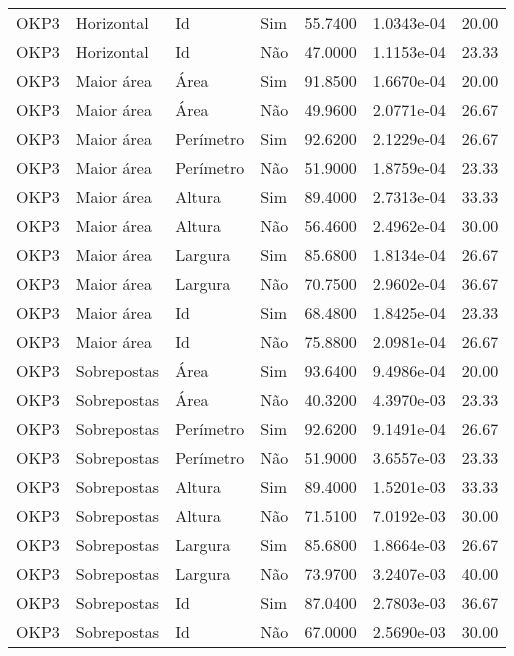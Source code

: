 \begin{tabular}{llllrrr}
    OKP3      & Horizontal  & Id        & Sim         & 55.7400      & 1.0343e-04 & 20.00    \\
    OKP3      & Horizontal  & Id        & Não         & 47.0000      & 1.1153e-04 & 23.33    \\
    OKP3      & Maior área  & Área      & Sim         & 91.8500      & 1.6670e-04 & 20.00    \\
    OKP3      & Maior área  & Área      & Não         & 49.9600      & 2.0771e-04 & 26.67    \\
    OKP3      & Maior área  & Perímetro & Sim         & 92.6200      & 2.1229e-04 & 26.67    \\
    OKP3      & Maior área  & Perímetro & Não         & 51.9000      & 1.8759e-04 & 23.33    \\
    OKP3      & Maior área  & Altura    & Sim         & 89.4000      & 2.7313e-04 & 33.33    \\
    OKP3      & Maior área  & Altura    & Não         & 56.4600      & 2.4962e-04 & 30.00    \\
    OKP3      & Maior área  & Largura   & Sim         & 85.6800      & 1.8134e-04 & 26.67    \\
    OKP3      & Maior área  & Largura   & Não         & 70.7500      & 2.9602e-04 & 36.67    \\
    OKP3      & Maior área  & Id        & Sim         & 68.4800      & 1.8425e-04 & 23.33    \\
    OKP3      & Maior área  & Id        & Não         & 75.8800      & 2.0981e-04 & 26.67    \\
    OKP3      & Sobrepostas & Área      & Sim         & 93.6400      & 9.4986e-04 & 20.00    \\
    OKP3      & Sobrepostas & Área      & Não         & 40.3200      & 4.3970e-03 & 23.33    \\
    OKP3      & Sobrepostas & Perímetro & Sim         & 92.6200      & 9.1491e-04 & 26.67    \\
    OKP3      & Sobrepostas & Perímetro & Não         & 51.9000      & 3.6557e-03 & 23.33    \\
    OKP3      & Sobrepostas & Altura    & Sim         & 89.4000      & 1.5201e-03 & 33.33    \\
    OKP3      & Sobrepostas & Altura    & Não         & 71.5100      & 7.0192e-03 & 30.00    \\
    OKP3      & Sobrepostas & Largura   & Sim         & 85.6800      & 1.8664e-03 & 26.67    \\
    OKP3      & Sobrepostas & Largura   & Não         & 73.9700      & 3.2407e-03 & 40.00    \\
    OKP3      & Sobrepostas & Id        & Sim         & 87.0400      & 2.7803e-03 & 36.67    \\
    OKP3      & Sobrepostas & Id        & Não         & 67.0000      & 2.5690e-03 & 30.00    \\
    \hline
\end{tabular}